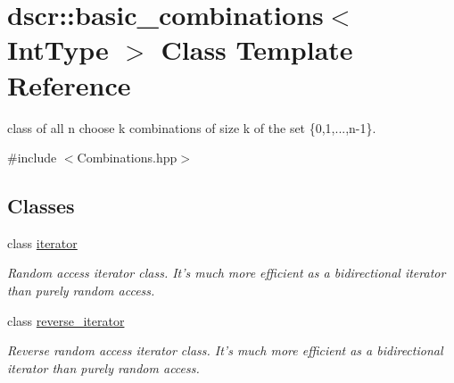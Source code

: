\hypertarget{classdscr_1_1basic__combinations}{\section{dscr\-:\-:basic\-\_\-combinations$<$ Int\-Type $>$ Class Template Reference}
\label{classdscr_1_1basic__combinations}
}


class of all n choose k combinations of size k of the set \{0,1,...,n-\/1\}.  




{\ttfamily \#include $<$Combinations.\-hpp$>$}

\subsection*{Classes}
\begin{DoxyCompactItemize}
\item 
class \hyperlink{classdscr_1_1basic__combinations_1_1iterator}{iterator}
\begin{DoxyCompactList}\small\item\em Random access iterator class. It's much more efficient as a bidirectional iterator than purely random access. \end{DoxyCompactList}\item 
class \hyperlink{classdscr_1_1basic__combinations_1_1reverse__iterator}{reverse\-\_\-iterator}
\begin{DoxyCompactList}\small\item\em Reverse random access iterator class. It's much more efficient as a bidirectional iterator than purely random access. \end{DoxyCompactList}\end{DoxyCompactItemize}
